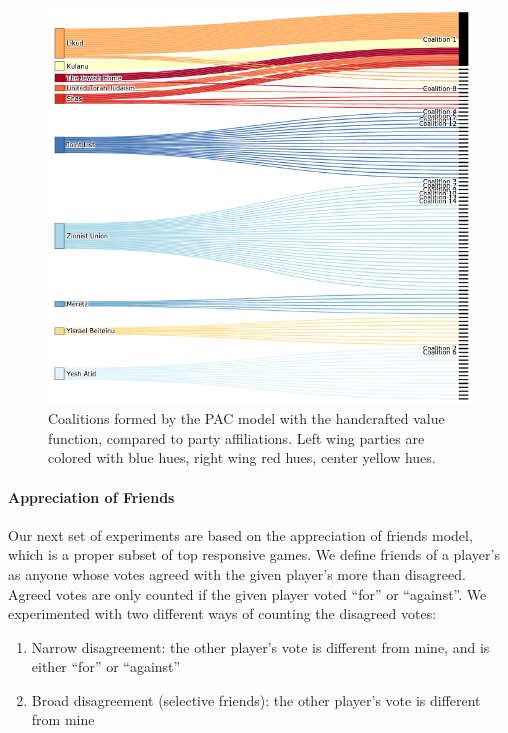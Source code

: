 \documentclass[letterpaper]{article} %
\theoremstyle{definition}
\begin{document}
\begin{figure}[htb]
\includegraphics[width=\columnwidth]{pac_value_function}
\caption{Coalitions formed by the PAC model with the handcrafted value function, compared to party affiliations. Left wing parties are colored with blue hues, right wing red hues, center yellow hues.}
\end{figure}

\paragraph{Appreciation of Friends}
Our next set of experiments are based on the appreciation of friends model, which is a proper subset of top responsive games. We define friends of a player's as anyone whose votes agreed with the given player's more than disagreed. Agreed votes are only counted if the given player voted ``for'' or ``against''. We experimented with two different ways of counting the disagreed votes:

\begin{enumerate}
  \item Narrow disagreement: the other player's vote is different from mine, and is either ``for'' or ``against''
  \item Broad disagreement (selective friends): the other player's vote is different from mine
\end{enumerate}
\end{document}
